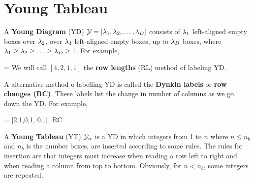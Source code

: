 \chapter{Young Tableau}
\label{ch-young-tableau}

A {\bf Young Diagram} (YD) ${\cal Y}=[\lambda_1, \lambda_2, \ldots, \lambda_D]$ 
consists of $\lambda_1$ left-aligned empty boxes
over $\lambda_2$, over 
$\lambda_3$ left-aligned empty boxes, up to
$\lambda_D$ boxes,
where $\lambda_1\geq \lambda_2\geq \ldots\geq \lambda_D\geq 1$.
For example,

\beq
[4, 2,1,1]=
\eeq
We will call $[4, 2,1,1]$ the
{\bf row lengths} (RL) method 
of labeling YD.

A alternative method o labelling YD is called the {\bf Dynkin labels}
or {\bf row changes (RC)}.
These labels list the change in number of columns as 
we go down the YD.
For example,

\beq
{}
=
[2,1,0,1, 0\ldots]_{RC}
\eeq



A {\bf Young Tableau} (YT)
${\cal Y}_\alpha$ is a YD in which integers from 1 to $n$ where $n\leq n_b$ and $n_b$ is the number boxes, are inserted according to some rules. The rules for insertion are that integers must increase when reading a row  left to right and
when reading a column from top to bottom. Obviously, for $n<n_b$, some integers are repeated.

